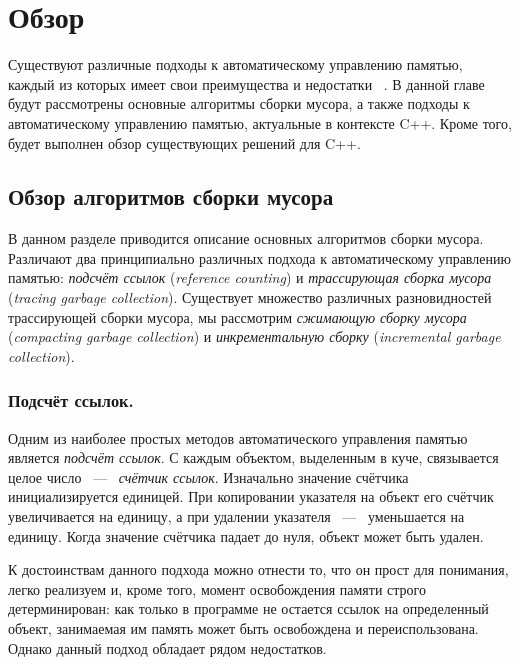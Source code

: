 \section{Обзор}

Существуют различные подходы к автоматическому управлению памятью, 
каждый из которых имеет свои преимущества и недостатки
~\cite{book:jones1996garbage,book:jones2011garbage}. 
В данной главе будут рассмотрены основные алгоритмы сборки мусора, 
а также подходы к автоматическому управлению памятью, актуальные в 
контексте C++. 
Кроме того, будет выполнен обзор существующих решений для C++. 


\subsection{Обзор алгоритмов сборки мусора}

В данном разделе приводится описание основных алгоритмов сборки мусора. 
Различают два принципиально различных подхода к автоматическому управлению памятью: 
\emph{подсчёт ссылок} (\emph{reference counting}) и \emph{трассирующая сборка мусора} 
(\emph{tracing garbage collection}). 
Существует множество различных разновидностей трассирующей сборки мусора, 
мы рассмотрим \emph{сжимающую сборку мусора} (\emph{compacting garbage collection}) и 
\emph{инкрементальную сборку} (\emph{incremental garbage collection}).  


\subsubsection{Подсчёт ссылок.}
\label{sec:ref_cnt}

Одним из наиболее простых методов автоматического управления памятью является 
\emph{подсчёт ссылок}. 
С каждым объектом, выделенным в куче, связывается целое число ~---~ \emph{счётчик ссылок}. 
Изначально значение счётчика инициализируется единицей. 
При копировании указателя на объект его счётчик увеличивается на единицу, 
а при удалении указателя ~---~ уменьшается на единицу. 
Когда значение счётчика падает до нуля, объект может быть удален. 

К достоинствам данного подхода можно отнести то, что он прост для понимания, 
легко реализуем и, кроме того, момент освобождения памяти строго детерминирован: 
как только в программе не остается ссылок на определенный объект, 
занимаемая им память может быть освобождена и переиспользована. 
Однако данный подход обладает рядом недостатков.

